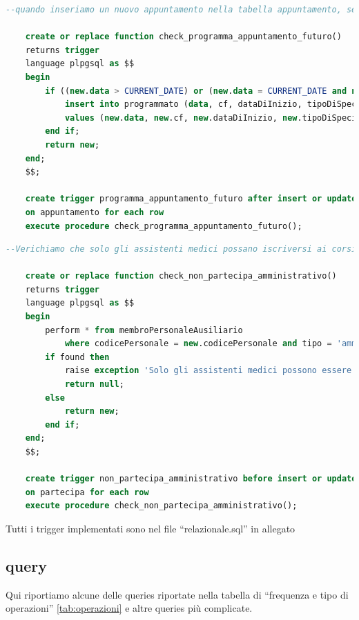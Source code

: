 \documentclass[11pt]{article}
\begin{document}
\begin{lstlisting}[language=SQL]
    --quando inseriamo un nuovo appuntamento nella tabella appuntamento, se e' un appuntamento futuro lo inseriamo anche in nella tabella Programmato

    create or replace function check_programma_appuntamento_futuro()
    returns trigger
    language plpgsql as $$
    begin
        if ((new.data > CURRENT_DATE) or (new.data = CURRENT_DATE and new.ora > extract(hour from CURRENT_TIME))) then
            insert into programmato (data, cf, dataDiInizio, tipoDiSpecializzazione, ora)
            values (new.data, new.cf, new.dataDiInizio, new.tipoDiSpecializzazione, new.ora);
        end if;
        return new;
    end;
    $$;
    
    create trigger programma_appuntamento_futuro after insert or update
    on appuntamento for each row
    execute procedure check_programma_appuntamento_futuro();
\end{lstlisting}
\begin{lstlisting}[language=SQL]
    --Verichiamo che solo gli assistenti medici possano iscriversi ai corsi di aggiornamento

    create or replace function check_non_partecipa_amministrativo()
    returns trigger
    language plpgsql as $$
    begin
        perform * from membroPersonaleAusiliario
            where codicePersonale = new.codicePersonale and tipo = 'amministrativo';
        if found then
            raise exception 'Solo gli assistenti medici possono essere iscritti ai corsi di aggiornamento';
            return null;
        else
            return new;
        end if;
    end;
    $$;
    
    create trigger non_partecipa_amministrativo before insert or update
    on partecipa for each row
    execute procedure check_non_partecipa_amministrativo();
\end{lstlisting}
Tutti i trigger implementati sono nel file ``relazionale.sql'' in allegato
\subsection{query}
Qui riportiamo alcune delle queries riportate nella tabella di ``frequenza e tipo di operazioni'' \ref{tab:operazioni} e altre queries più complicate.
\end{document}
